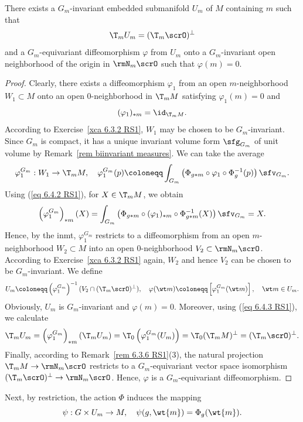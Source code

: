 \begin{lem}[{{\cite[Lem.~6.4.4]{RS1}}}]\label{lem 6.4.4 RS1}
    There exists a $G_m$-invariant embedded submanifold $U_m$ of $M$ containing $m$ such that 
    \[\T_mU_m=(\T_m\scrO)^\perp\]
    and a $G_m$-equivariant diffeomorphism $\varphi$ from $U_m$ onto a $G_m$-invariant open neighborhood of the origin in $\rmN_m\scrO$ such that $\varphi(m)=0$.
\end{lem}
\begin{proof}
    Clearly, there exists a diffeomorphism $\varphi_1$ from an open $m$-neighborhood $W_1\subset M$ onto an open $0$-neighborhood in $\T_m M$ satisfying $\varphi_1(m)=0$ and 
    \[(\varphi_1)_{\ast m}=\id_{\T_m M}.\label{eq 6.4.2 RS1}\] According to Exercise~\ref{xca 6.3.2 RS1}, $W_1$ may be chosen to be $G_m$-invariant. Since $G_m$ is compact, it has a unique invariant volume form $\sfg_{G_m}$ of unit volume by Remark~\ref{rem biinvariant measures}. We can take the average 
    \[\varphi_1^{G_m}:W_1\to \T_m M,\quad \varphi_1^{G_m}(p)\coloneqq \int_{G_m}\left(\Phi_{g\ast m}\circ \varphi_1\circ \Phi_{g}^{-1}(p)\right)\sfv_{G_m}.\]
    Using (\ref{eq 6.4.2 RS1}), for $X\in\T_m M$, we obtain 
    \[\left(\varphi_1^{G_m}\right)_{\ast m}(X)=\int_{G_m}\left(\Phi_{g\ast m}\circ (\varphi_1)_{\ast m}\circ \Phi_{g\ast m}^{-1}(X)\right)\sfv_{G_m}=X.\label{eq 6.4.3 RS1}\]
    Hence, by the \gls{inmt}, $\varphi_1^{G_m}$ restricts to a diffeomorphism from an open $m$-neighborhood $W_2\subset M$ into an open $0$-neighborhood $V_2\subset \rmN_m \scrO$. According to Exercise~\ref{xca 6.3.2 RS1} again, $W_2$ and hence $V_2$ can be chosen to be $G_m$-invariant. We define 
    \[U_m\coloneqq \left(\varphi_1^{G_m}\right)^{-1}(V_2\cap (\T_m \scrO)^{\perp}),\quad \varphi(\wt m)\coloneqq \left[\varphi_1^{G_m}(\wt m)\right],\quad \wt m\in U_m.\]
    Obviously, $U_m$ is $G_m$-invariant and $\varphi(m)=0$. Moreover, using (\ref{eq 6.4.3 RS1}), we calculate 
    \[\T_m U_m=\left(\varphi_1^{G_m}\right)_{\ast m}(\T_m U_m)=\T_0\left(\varphi_1^{G_m}(U_m)\right)=\T_0(\T_m M)^\perp=(\T_m \scrO)^\perp.\]
    Finally, according to Remark~\ref{rem 6.3.6 RS1}(3), the natural projection $\T_m M\to \rmN_m \scrO$ restricts to a $G_m$-equivariant vector space isomorphism $(\T_m \scrO)^\perp\to \rmN_m \scrO$. Hence, $\varphi$ is a $G_m$-equivariant diffeomorphism.
\end{proof}

Next, by restriction, the action $\Phi$ induces the mapping
\[\psi:G\times U_m\to M,\quad \psi(g,\wt{m})=\Phi_g(\wt{m}).\]


